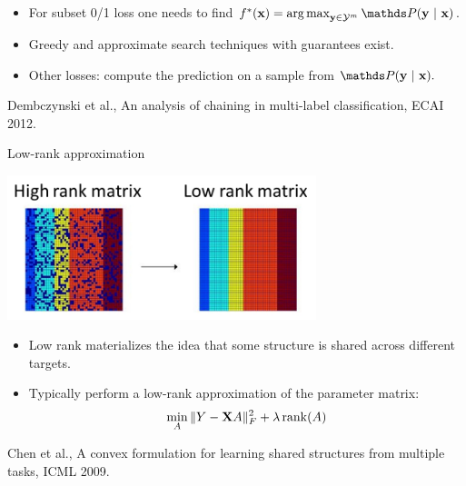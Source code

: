 \documentclass[11pt,compress,t,notes=noshow, xcolor=table]{beamer}
\begin{document}
\begin{frame}[fragile]
	\vspace{0.1cm}
	\begin{itemize}\small
		\item For subset 0/1 loss one needs to find $
		\fbayes(\xv) = \argmax_{\yv \in \Yspace^m} \P(\yv ~|~ \xv)
		$.
		\item Greedy and approximate search techniques with guarantees exist.
		\item Other losses: compute the prediction on a sample from $\P(\yv ~|~  \xv).$
	\end{itemize}
{\tiny Dembczynski et al., An analysis of chaining in multi-label classification, ECAI 2012.}
	
\end{frame}



\begin{frame}{Low-rank approximation}
	
	\begin{center}
		\includegraphics[width=9cm]{figure/lowrank}
	\end{center}

	\begin{itemize}
%		
		\item Low rank materializes the idea that some structure is shared across different targets.
%
		\item 	Typically perform a low-rank approximation of the parameter matrix:
		$$\min_A \|Y - \mathbf{X} A \|^2_F + \lambda \, \mathrm{rank}(A)$$
%		
	\end{itemize}
	{\tiny Chen et al., A convex formulation for learning shared structures from
	multiple tasks, ICML 2009.}
\end{frame}



\end{document}
